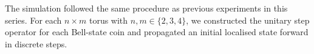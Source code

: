 The simulation followed the same procedure as previous experiments in
this series. For each $n \times m$ torus with
$n, m \in \{2, 3, 4\}$, we constructed the unitary step operator for
each Bell-state coin and propagated an initial localised state forward
in discrete steps.
